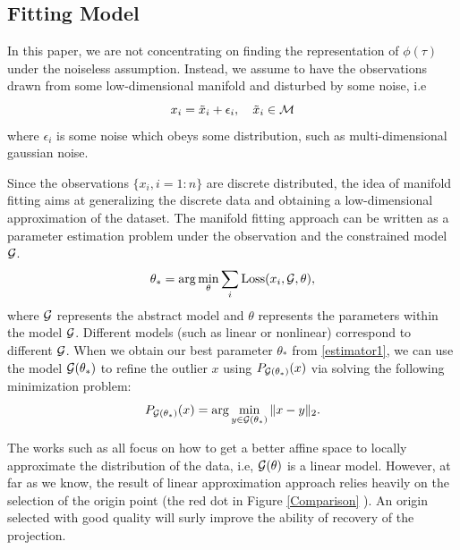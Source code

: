 \documentclass[aos,preprint]{imsart}
\theoremstyle{remark}
\begin{document}
\subsection{Fitting Model}
In this paper, we are not concentrating on finding the representation of $\phi(\tau)$ under the noiseless assumption. Instead, we assume to have the observations drawn from some low-dimensional manifold and disturbed by some noise, i.e
\[
x_i = \tilde{x}_i+\epsilon_i, \quad \tilde{x}_i \in \cal M
\] 
where $\epsilon_i$ is some noise which obeys some distribution, such as multi-dimensional gaussian noise.

Since the observations $\{x_i, i=1:n\}$ are discrete distributed, the idea of manifold fitting aims at generalizing the discrete data and obtaining a low-dimensional approximation of the dataset. The manifold fitting approach can be written as a parameter estimation problem under the observation and the constrained model $\cal G$.
\begin{equation}\label{estimator1}
 \theta_* =\arg \min_\theta  \sum_i {\rm Loss}(x_i, {\cal G}, \theta ),
\end{equation}
where $\cal G$ represents the abstract model and $\theta$ represents the parameters within the model $\cal G$. Different models (such as linear or nonlinear) correspond to different $\cal G$. When we obtain our best parameter $\theta_*$ from \eqref{estimator1}, we can use the model ${\cal G}(\theta_*)$ to refine the outlier $x$ using $P_{{\cal G}(\theta_*) }(x)$ via solving the following minimization problem:
\[
P_{{\cal G}(\theta_*) }(x) = \arg \min_{y\in {\cal G}(\theta_*) } \|x-y\|_2.
\]
 
The works such as \cite{genovese2014nonparametric,ozertem2011locally} all focus on how to get a better affine space to locally approximate the distribution of the data, i.e, ${\cal G}(\theta)$ is a linear model. However, at far as we know, the result of linear approximation approach relies heavily on the selection of the origin point (the red dot in Figure \ref{Comparison} ). An origin selected with good quality will surly improve the ability of recovery of the projection.
\end{document}
